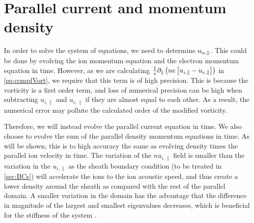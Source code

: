 \section{Parallel current and momentum density}
%
In order to solve the system of equations, we need to determine $u_{\alpha,\|}$.
This could be done by evolving the ion momentum equation and the electron momentum equation in time.
However, as we are calculating $\frac{1}{e}\partial_\|\left(ne\left[u_{i,\|} - u_{e,\|}\right]\right)$ in \cref{eq:complVort}, we require that this term is of high precision.
This is because the vorticity is a first order term, and loss of numerical precision can be high when subtracting $u_{i,\|}$ and $u_{e,\|}$ if they are almost equal to each other.
As a result, the numerical error may pollute the calculated order of the modified vorticity.

Therefore, we will instead evolve the parallel current equation in time.
We also choose to evolve the sum of the parallel density momentum equations in time.
As will be shown, this is to high accuracy the same as evolving density times the parallel ion velocity in time.
The variation of the $nu_{i,\|}$ field is smaller than the variation in the $u_{i,\|}$ as the sheath boundary condition (to be treated in \cref{sec:BCs}) will accelerate the ions to the ion acoustic speed, and thus create a lower density around the sheath as compared with the rest of the parallel domain.
A smaller variation in the domain has the advantage that the difference in magnitude of the largest and smallest eigenvalues decreases, which is beneficial for the stiffness of the system \cite{Leveque2007book}.

